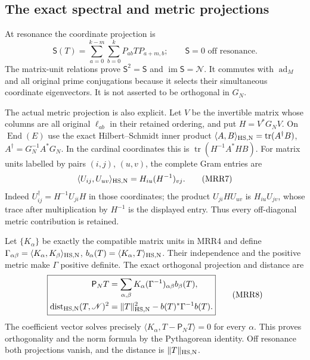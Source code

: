 \subsection{The exact spectral and metric projections}

At resonance the coordinate projection is
\[
\mathsf S(T)=\sum_{a=0}^{k-m}\sum_{b=0}^k
                 P_{ab}T P_{a+m,b};
\qquad \mathsf S=0\text{ off resonance}.
\tag{MRR6}
\]
The matrix-unit relations prove $\mathsf S^2=\mathsf S$ and
$\operatorname{im}\mathsf S=\mathscr N$.
It commutes with $\operatorname{ad}_M$ and all original prime
conjugations because it selects their simultaneous coordinate
eigenvectors. It is not asserted to be orthogonal in $G_N$.

The actual metric projection is also explicit.
Let $V$ be the invertible matrix whose columns are all
original $\ell_{ab}$ in their retained ordering, and put
$H=V^*G_NV$.
On $\operatorname{End}(E)$ use the exact Hilbert--Schmidt
inner product
$\langle A,B\rangle_{\rm HS,N}=\operatorname{tr}(A^\dagger B)$,
$A^\dagger=G_N^{-1}A^*G_N$.
In the cardinal coordinates this is
$\operatorname{tr}(H^{-1}A^*HB)$.
For matrix units labelled by pairs $(i,j)$, $(u,v)$, the
complete Gram entries are
\[
\langle U_{ij},U_{uv}\rangle_{\rm HS,N}
                          =H_{iu}(H^{-1})_{vj}.
\tag{MRR7}
\]
Indeed $U_{ij}^\dagger=H^{-1}U_{ji}H$ in those coordinates;
the product $U_{ji}HU_{uv}$ is $H_{iu}U_{jv}$, whose trace
after multiplication by $H^{-1}$ is the displayed entry.
Thus every off-diagonal metric contribution is retained.

Let $\{K_\alpha\}$ be exactly the compatible matrix units
in MRR4 and define
$\Gamma_{\alpha\beta}=\langle K_\alpha,K_\beta\rangle_{\rm HS,N}$,
$b_\alpha(T)=\langle K_\alpha,T\rangle_{\rm HS,N}$.
Their independence and the positive metric make $\Gamma$
positive definite. The exact orthogonal projection and
distance are
\[
\boxed{
\begin{aligned}
\mathsf P_N T
 &=\sum_{\alpha,\beta}K_\alpha
                   (\Gamma^{-1})_{\alpha\beta}b_\beta(T),\\
\operatorname{dist}_{\rm HS,N}(T,\mathscr N)^2
 &=\|T\|_{\rm HS,N}^2-b(T)^*\Gamma^{-1}b(T).
\end{aligned}}
\tag{MRR8}
\]
The coefficient vector solves precisely
$\langle K_\alpha,T-\mathsf P_NT\rangle=0$ for every $\alpha$.
This proves orthogonality and the norm formula by the
Pythagorean identity. Off resonance both projections vanish,
and the distance is $\|T\|_{\rm HS,N}$.

